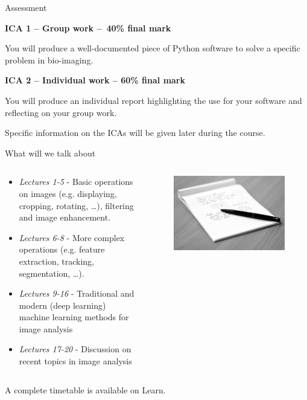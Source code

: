 \documentclass[9pt, aspectratio=169]{beamer}
\begin{document}
\begin{frame}
    {Assessment}

    \textbf{ICA 1 – Group work – 40\% final mark}

    You will produce a well-documented piece of Python software to solve a specific problem in bio-imaging.

    \textbf{ICA 2 – Individual work – 60\% final mark}

    You will produce an individual report highlighting the use for your software and reflecting on your group work.

    \vspace{2em}
    Specific information on the ICAs will be given later during the course.
\end{frame}

\begin{frame}
    {What will we talk about}
    \begin{columns}
        \begin{column}{0.7\textwidth}
            \begin{itemize}[<+->]
                \item \textit{Lectures 1-5} - Basic operations on images (e.g. displaying, cropping, rotating, \dots), filtering and image enhancement.
                \item \textit{Lectures 6-8} - More complex operations (e.g. feature extraction, tracking, segmentation, \dots).
                \item \textit{Lectures 9-16} - Traditional and modern (deep learning) machine learning methods for image analysis
                \item \textit{Lectures 17-20} - Discussion on recent topics in image analysis
            \end{itemize}
        \end{column}

        \begin{column}{0.3\textwidth}
            \begin{figure}
                \includegraphics[width=\textwidth]{notes.jpg}
                \caption{\color{gray}{Matt Cornock - CC BY-NC 2.0}}
            \end{figure}
        \end{column}
    \end{columns}
    A complete timetable is available on Learn.
\end{frame}
\end{document}
